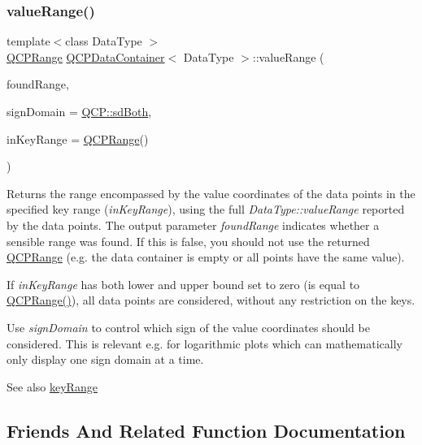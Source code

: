 \subsubsection{\texorpdfstring{value\+Range()}{valueRange()}}
{\footnotesize\ttfamily template$<$class Data\+Type $>$ \\
\hyperlink{class_q_c_p_range}{Q\+C\+P\+Range} \hyperlink{class_q_c_p_data_container}{Q\+C\+P\+Data\+Container}$<$ Data\+Type $>$\+::value\+Range (\begin{DoxyParamCaption}\item[{bool \&}]{found\+Range,  }\item[{\hyperlink{namespace_q_c_p_afd50e7cf431af385614987d8553ff8a9}{Q\+C\+P\+::\+Sign\+Domain}}]{sign\+Domain = {\ttfamily \hyperlink{namespace_q_c_p_afd50e7cf431af385614987d8553ff8a9aa38352ef02d51ddfa4399d9551566e24}{Q\+C\+P\+::sd\+Both}},  }\item[{const \hyperlink{class_q_c_p_range}{Q\+C\+P\+Range} \&}]{in\+Key\+Range = {\ttfamily \hyperlink{class_q_c_p_range}{Q\+C\+P\+Range}()} }\end{DoxyParamCaption})}

Returns the range encompassed by the value coordinates of the data points in the specified key range ({\itshape in\+Key\+Range}), using the full {\itshape Data\+Type\+::value\+Range} reported by the data points. The output parameter {\itshape found\+Range} indicates whether a sensible range was found. If this is false, you should not use the returned \hyperlink{class_q_c_p_range}{Q\+C\+P\+Range} (e.\+g. the data container is empty or all points have the same value).

If {\itshape in\+Key\+Range} has both lower and upper bound set to zero (is equal to {\ttfamily \hyperlink{class_q_c_p_range}{Q\+C\+P\+Range()}}), all data points are considered, without any restriction on the keys.

Use {\itshape sign\+Domain} to control which sign of the value coordinates should be considered. This is relevant e.\+g. for logarithmic plots which can mathematically only display one sign domain at a time.

\begin{DoxySeeAlso}{See also}
\hyperlink{class_q_c_p_data_container_aba6e1a93c21ccc56a432b4a02c9d0ed2}{key\+Range} 
\end{DoxySeeAlso}


\subsection{Friends And Related Function Documentation}
\mbox{\label{class_q_c_p_data_container_a74c5e06728cb6fa778a25d9ec0c4bd36}} 
